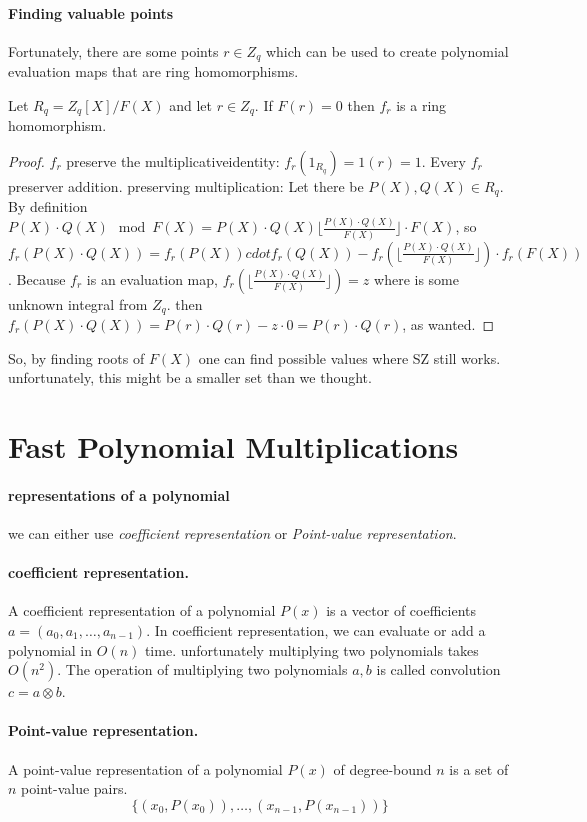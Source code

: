 \paragraph{Finding valuable points}
Fortunately, there are some points $r\in Z_q$ which can be used to create polynomial evaluation maps that 
are ring homomorphisms.
\begin{thm}
  Let $R_q=Z_q[X]/F(X)$ and let $r\in Z_q$. If $F(r)=0$ then $f_r$ is a ring homomorphism.
\end{thm}
\begin{proof}
  $f_r$ preserve the multiplicativeidentity: $f_r(1_{R_q}) = 1(r)=1$.
  Every $f_r$ preserver addition.
  preserving multiplication:
  Let there be $P(X), Q(X) \in R_q$. 
  By definition $P(X)\cdot Q(X) \mod F(X) = P(X)\cdot Q(X) \lfloor \frac{P(X)\cdot Q(X)}{F(X)} \rfloor \cdot F(X)$,
  so $f_r(P(X)\cdot Q(X))= f_r(P(X))cdot f_r(Q(X)) - f_r(\lfloor  \frac{P(X)\cdot Q(X)}{F(X)} \rfloor)\cdot f_r(F(X))$.
  Because $f_r$ is an evaluation map, $f_r(\lfloor  \frac{P(X)\cdot Q(X)}{F(X)} \rfloor)=z$ where is some unknown integral from $Z_q$.
  then $f_r(P(X)\cdot Q(X)) =P(r)\cdot Q(r) - z \cdot 0= P(r)\cdot Q(r)$, as wanted.
\end{proof}

So, by finding roots of $F(X)$ one can find possible values where SZ still works. 
unfortunately, this might be a smaller set than we thought.

\section{Fast Polynomial Multiplications}
\paragraph{representations of a polynomial}
we can either use \emph{coefficient representation} or \emph{Point-value representation}.

\paragraph{coefficient representation.}
A coefficient representation of a polynomial $P(x)$ is a vector of coefficients 
$a=(a_0,a_1,\dots, a_{n-1})$.
In coefficient representation, we can evaluate or add a polynomial in $O(n)$ time. 
unfortunately multiplying two polynomials takes $O(n^2)$.
The operation of multiplying two polynomials $a,b$ is called convolution $c=a\otimes b$.


\paragraph{Point-value representation.}
A point-value representation of a polynomial $P(x)$ of degree-bound $n$ is a set of $n$ point-value pairs.
$$ \{ (x_0,P(x_0)),\dots , (x_{n-1}, P(x_{n-1})) \}$$

